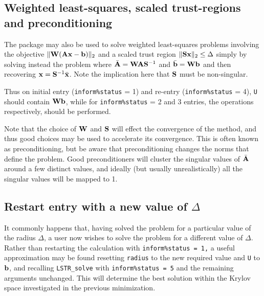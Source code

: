 \documentclass{galahad}
\newcommand{\packagename}{LS\-TR}
\begin{document}

\subsection{Weighted least-squares, scaled trust-regions and preconditioning}
The package may also be used to solve weighted least-squares problems
involving the objective $\| {\mathbf{W}}({\mathbf{A}}{\mathbf{x}}-{\mathbf{b}})\|_2$ and a scaled trust region
$\|{\mathbf{S}}{\mathbf{x}}\|_2 \leq \Delta$ simply by solving instead the problem
where $\bar{{\mathbf{A}}} = {\mathbf{W}} {\mathbf{A}} {\mathbf{S}}^{-1}$ and
$\bar{{\mathbf{b}}} = {\mathbf{W}} {\mathbf{b}}$
and then recovering ${\mathbf{x}} = {\mathbf{S}}^{-1} \bar{{\mathbf{x}}}$. Note the implication here
that ${\mathbf{S}}$ must be non-singular.

Thus on initial entry ({\tt inform\%status} = 1) and re-entry
({\tt inform\%status} = 4), {\tt U} should contain ${\mathbf{W}} {\mathbf{b}}$,
while for {\tt inform\%status} = 2 and 3 entries, the operations
respectively, should be performed.

Note that the choice of ${\mathbf{W}}$ and ${\mathbf{S}}$ will effect the convergence of the
method, and thus good choices may be used to accelerate its convergence. This
is often known as preconditioning, but be aware that preconditioning changes
the norms that define the problem. Good preconditioners will cluster
the singular values of $\bar{{\mathbf{A}}}$ around a few distinct values, and ideally
(but usually unrealistically) all the singular values will be mapped to 1.


\subsection{Restart entry with a new value of $\Delta$}
It commonly happens that, having solved the problem for a particular value
of the radius $\Delta$, a user now wishes to solve the problem for a different
value of $\Delta$. Rather than restarting the calculation with
{\tt inform\%status = 1,} a useful approximation may be found
resetting {\tt radius} to the new required value and {\tt U} to ${\mathbf{b}}$,
and recalling {\tt \packagename\_solve}
with {\tt inform\%status = 5} and the remaining arguments unchanged.
This will determine the best solution within the Krylov space investigated
in the previous minimization.
\end{document}

